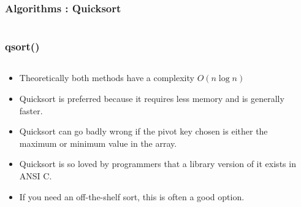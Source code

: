 
\begin{frame}[fragile]
\frametitle{Algorithms : Quicksort}
\begin{columns}[T]

\begin{column}{0.45\textwidth}

\end{column}

\pause
\begin{column}{0.45\textwidth}

\end{column}

\end{columns}
\end{frame}


\begin{frame}[fragile]
\frametitle{qsort()}
\begin{columns}[T]

\begin{column}{0.45\textwidth}
\begin{itemize}[<+->]
\item Theoretically both methods have a complexity $O(n \log n)$
\item Quicksort is preferred because it requires less memory and is generally faster.
\item Quicksort can go badly wrong if the pivot key chosen is either the maximum or minimum value in the array.
\item Quicksort is so loved by programmers that a library version of it exists in ANSI C.
\item If you need an off-the-shelf sort, this is often a good option.
\end{itemize}
\end{column}

\pause
\begin{column}{0.45\textwidth}

\end{column}

\end{columns}
\end{frame}


